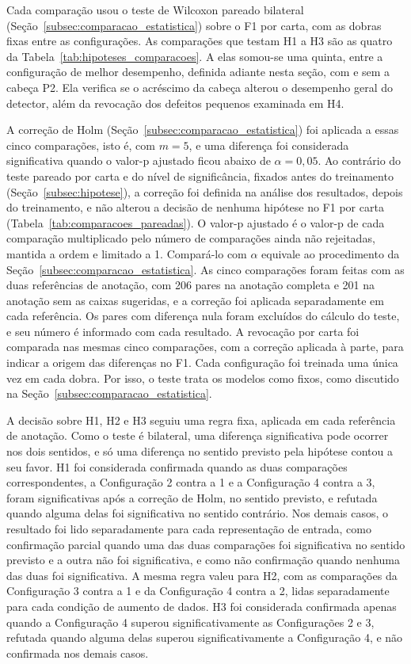 \documentclass[
    12pt,                %
    openright,           %
    oneside,             %
    a4paper,             %
    english,             %
    brazil               %
]{abntex2}
\begin{document}
Cada comparação usou o teste de Wilcoxon pareado bilateral
(Seção~\ref{subsec:comparacao_estatistica}) sobre o F1 por carta, com
as dobras fixas entre as configurações. As comparações que testam H1 a
H3 são as quatro da Tabela~\ref{tab:hipoteses_comparacoes}. A elas somou-se
uma quinta, entre a configuração de melhor desempenho, definida
adiante nesta seção, com e sem a cabeça P2. Ela verifica se o acréscimo
da cabeça alterou o desempenho geral do detector, além da revocação
dos defeitos pequenos examinada em H4.

A correção de Holm (Seção~\ref{subsec:comparacao_estatistica}) foi aplicada a
essas cinco comparações, isto é,
com $m = 5$, e uma diferença foi considerada significativa quando o
valor-p ajustado ficou abaixo de $\alpha = 0{,}05$. Ao contrário do
teste pareado por carta e do nível de significância, fixados antes do
treinamento (Seção~\ref{subsec:hipotese}), a correção foi definida na
análise dos resultados, depois do treinamento, e não alterou a decisão
de nenhuma hipótese no F1 por carta
(Tabela~\ref{tab:comparacoes_pareadas}). O valor-p ajustado
é o valor-p de cada comparação multiplicado pelo número de comparações
ainda não rejeitadas, mantida a ordem e limitado a 1. Compará-lo com
$\alpha$ equivale ao procedimento da
Seção~\ref{subsec:comparacao_estatistica}. As cinco
comparações foram feitas com as duas referências de anotação, com 206
pares na anotação completa e 201 na anotação sem as caixas sugeridas, e
a correção foi aplicada separadamente em cada referência. Os pares com
diferença nula foram excluídos do cálculo do teste, e seu número é
informado com cada resultado. A revocação por carta foi comparada nas mesmas cinco comparações, com a correção aplicada à parte, para indicar a
origem das diferenças no F1. Cada configuração foi
treinada uma única vez em cada dobra. Por isso, o teste trata os
modelos como fixos, como discutido na
Seção~\ref{subsec:comparacao_estatistica}.

A decisão sobre H1, H2 e H3 seguiu uma regra fixa, aplicada em cada referência de anotação. Como o teste é bilateral, uma diferença significativa pode ocorrer nos dois sentidos, e só uma diferença no sentido previsto pela hipótese contou a seu favor. H1 foi considerada confirmada quando as duas comparações correspondentes, a Configuração 2 contra a 1 e a Configuração 4 contra a 3, foram significativas após a correção de Holm, no sentido previsto, e refutada quando alguma delas foi significativa no sentido contrário. Nos demais casos, o resultado foi lido separadamente para cada representação de entrada, como confirmação parcial quando uma das duas comparações foi significativa no sentido previsto e a outra não foi significativa, e como não confirmação quando nenhuma das duas foi significativa. A mesma regra valeu para H2, com as comparações da Configuração 3 contra a 1 e da Configuração 4 contra a 2, lidas separadamente para cada condição de aumento de dados. H3 foi considerada confirmada apenas quando a Configuração 4 superou significativamente as Configurações 2 e 3, refutada quando alguma delas superou significativamente a Configuração 4, e não confirmada nos demais casos.
\end{document}
